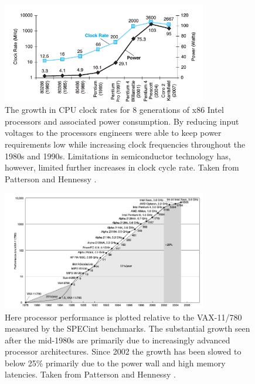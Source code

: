 \begin{figure}[ht!]
 \begin{mdframed}
  \centering
  \includegraphics[width=0.8\textwidth]{images/cpu_clocks.png}
  \caption[Power wall]{The growth in CPU clock rates for 8 generations of x86 Intel processors and associated power consumption. By reducing input voltages to the processors
  engineers were able to keep power requirements low while increasing clock frequencies throughout the 1980s and 1990s. Limitations in semiconductor technology has, however,
  limited further increases in clock cycle rate. Taken from Patterson and Hennessy \cite[ch. 1]{patterson2009computer}.}
  \label{fig_clocks}
 \end{mdframed}
\end{figure}

\begin{figure}[ht!]
 \begin{mdframed}
  \centering
  \includegraphics[width=0.8\textwidth]{images/runtime_decrease_cpu.png}
  \caption[Program response time decline]{Here processor performance is plotted relative to the VAX-11/780 measured by the SPECint benchmarks. The substantial growth seen after the mid-1980s
  are primarily due to increasingly advanced processor architectures. Since 2002 the growth has been slowed to below 25\% primarily due to the power wall and high memory latencies. Taken from Patterson and Hennessy \cite[ch. 1]{patterson2009computer}.}
  \label{fig_runtime_decrease_cpu}
 \end{mdframed}
\end{figure}

